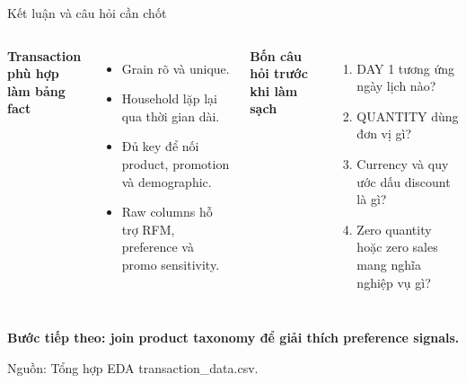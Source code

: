 \documentclass[aspectratio=169,11pt]{beamer}
\newcommand{\src}[1]{\par\vfill{\tiny\color{gray}Nguồn: #1}}
\begin{document}
\begin{frame}{Kết luận và câu hỏi cần chốt}
\begin{columns}[T]
\textbf{Transaction phù hợp làm bảng fact}
\begin{itemize}
\item Grain rõ và unique.
\item Household lặp lại qua thời gian dài.
\item Đủ key để nối product, promotion và demographic.
\item Raw columns hỗ trợ RFM, preference và promo sensitivity.
\end{itemize}
\textbf{Bốn câu hỏi trước khi làm sạch}
\begin{enumerate}
\item DAY 1 tương ứng ngày lịch nào?
\item QUANTITY dùng đơn vị gì?
\item Currency và quy ước dấu discount là gì?
\item Zero quantity hoặc zero sales mang nghĩa nghiệp vụ gì?
\end{enumerate}
\end{columns}
\medskip
\centering
\color{structure.fg}\bfseries Bước tiếp theo: join product taxonomy để giải thích preference signals.
\src{Tổng hợp EDA transaction\_data.csv.}
\end{frame}
\end{document}
